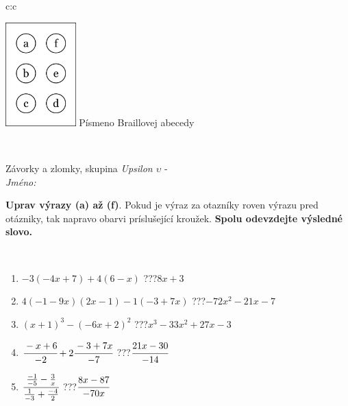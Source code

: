 \documentclass[10pt]{report}
\begin{document}
\begin{tabular}{c:c}
\begin{minipage}[c][104.5mm][t]{0.5\linewidth}
\begin{center}
\begin{minipage}{0.20\linewidth}
\begin{center}
\includegraphics[height=40mm]{../images/braille.png}
{\small Písmeno Braillovej abecedy}
\end{center}
\end{minipage}
\end{center}
\end{minipage}
\\ \hdashline
\begin{minipage}[c][104.5mm][t]{0.5\linewidth}
\begin{center}
\vspace{7mm}
{\huge Závorky a zlomky, skupina \textit{Upsilon $\upsilon$} -}\\[5mm]
\textit{Jméno:}\phantom{xxxxxxxxxxxxxxxxxxxxxxxxxxxxxxxxxxxxxxxxxxxxxxxxxxxxxxxxxxxxxxxxx}\\[5mm]
\begin{minipage}{0.95\linewidth}
\begin{center}
\textbf{Uprav výrazy (a) až (f)}. Pokud je výraz za otazníky roven výrazu pred otázniky, tak napravo obarvi príslušející kroužek. \textbf{Spolu odevzdejte výsledné slovo.}
\end{center}
\end{minipage}
\\[1mm]
\begin{minipage}{0.79\linewidth}
\begin{center}
\begin{varwidth}{\linewidth}
\begin{enumerate}
\normalsize
\item $-3(-4x+7)+4(6-x)$\quad \dotfill\; ???\;\dotfill \quad $8x+3$
\item $4(-1-9x)(2x-1)-1(-3+7x)$\quad \dotfill\; ???\;\dotfill \quad $-72x^2-21x-7$
\item $(x+1)^3-(-6x+2)^2$\quad \dotfill\; ???\;\dotfill \quad $x^3-33x^2+27x-3$
\item $\cfrac{-x+6}{-2}+2\cfrac{-3+7x}{-7}$\quad \dotfill\; ???\;\dotfill \quad $\cfrac{21x-30}{-14}$
\item $\cfrac{\frac{-1}{-5}-\frac{3}{x}}{\frac{1}{-3}+\frac{-4}{2}}$\quad \dotfill\; ???\;\dotfill \quad $\cfrac{8x-87}{-70x}$

\end{enumerate}
\end{varwidth}
\end{center}
\end{minipage}
\end{center}
\end{minipage}
\end{tabular}
\end{document}
